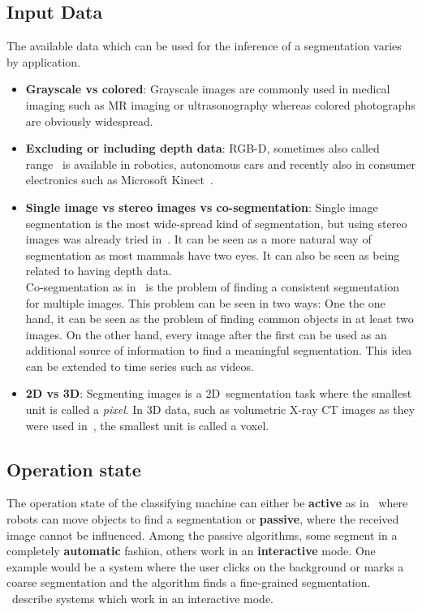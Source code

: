 \documentclass[technote,a4paper,leqno]{IEEEtran}
\begin{document}
\subsection{Input Data}\label{subsec:input-data}
The available data which can be used for the inference of a segmentation varies
by application.
\begin{itemize}
    \item \textbf{Grayscale vs colored}: Grayscale images are commonly used in
          medical imaging such as \gls{MR} imaging or ultrasonography whereas
          colored photographs are obviously widespread.
    \item \textbf{Excluding or including depth data}: RGB-D, sometimes also
          called range~\cite{hoover1996experimental} is available in robotics,
          autonomous cars and recently also in consumer electronics such as
          Microsoft Kinect~\cite{6190806}.
    \item \textbf{Single image vs stereo images vs co-segmentation}: Single
          image segmentation is the most wide-spread kind of segmentation, but
          using stereo images was already tried in~\cite{boykov2001fast}. It
          can be seen as a more natural way of segmentation as most mammals
          have two eyes. It can also be seen as being related to having
          depth data.\\
          Co-segmentation as in~\cite{1640859,collins2012random} is the problem
          of finding a consistent segmentation for multiple images. This problem
          can be seen in two ways: One the one hand, it can be seen as the problem
          of finding common objects in at least two images. On the other hand,
          every image after the first can be used as an additional source of
          information to find a meaningful segmentation. This idea can be
          extended to time series such as videos.
    \item \textbf{2D vs 3D}: Segmenting images is a 2D~segmentation task where
          the smallest unit is called a \textit{pixel}. In 3D data, such as
          volumetric X-ray CT images as they were used in~\cite{929615}, the
          smallest unit is called a voxel.
\end{itemize}
\subsection{Operation state}\label{subsec:operation-state}
The operation state of the classifying machine can either be \textbf{active} as
in~\cite{schiebener2011segmentation,schiebener2012discovery} where robots can
move objects to find a segmentation or \textbf{passive}, where the received
image cannot be influenced. Among the passive algorithms, some segment in a
completely \textbf{automatic} fashion, others work in an \textbf{interactive}
mode. One example would be a system where the user clicks on the background or
marks a coarse segmentation and the algorithm finds a fine-grained
segmentation.
\cite{boykov2000interactive,rother2004grabcut,protiere2007interactive}~describe
systems which work in an interactive mode.
\end{document}

